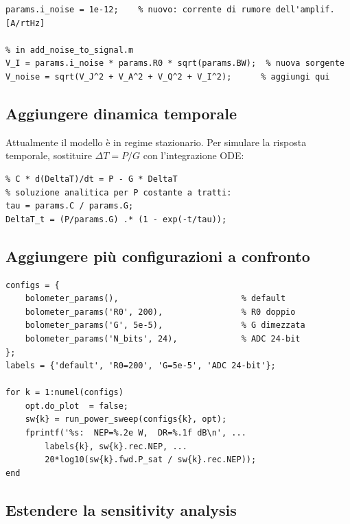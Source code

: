 \documentclass[11pt,a4paper]{article}
\begin{document}
\begin{lstlisting}[caption={Schema per aggiungere una nuova sorgente di rumore}]
% in bolometer_params.m
params.i_noise = 1e-12;    % nuovo: corrente di rumore dell'amplif. [A/rtHz]

% in add_noise_to_signal.m
V_I = params.i_noise * params.R0 * sqrt(params.BW);  % nuova sorgente
V_noise = sqrt(V_J^2 + V_A^2 + V_Q^2 + V_I^2);      % aggiungi qui
\end{lstlisting}

\subsection{Aggiungere dinamica temporale}

Attualmente il modello è in regime stazionario. Per simulare la
risposta temporale, sostituire $\Delta T = P/G$ con l'integrazione ODE:

\begin{lstlisting}[caption={Schema per risposta temporale}]
% in forward_model.m -- modalita' dinamica
% C * d(DeltaT)/dt = P - G * DeltaT
% soluzione analitica per P costante a tratti:
tau = params.C / params.G;
DeltaT_t = (P/params.G) .* (1 - exp(-t/tau));
\end{lstlisting}

\subsection{Aggiungere più configurazioni a confronto}

\begin{lstlisting}[caption={Confronto tra configurazioni in main.m}]
configs = {
    bolometer_params(),                         % default
    bolometer_params('R0', 200),                % R0 doppio
    bolometer_params('G', 5e-5),                % G dimezzata
    bolometer_params('N_bits', 24),             % ADC 24-bit
};
labels = {'default', 'R0=200', 'G=5e-5', 'ADC 24-bit'};

for k = 1:numel(configs)
    opt.do_plot  = false;
    sw{k} = run_power_sweep(configs{k}, opt);
    fprintf('%s:  NEP=%.2e W,  DR=%.1f dB\n', ...
        labels{k}, sw{k}.rec.NEP, ...
        20*log10(sw{k}.fwd.P_sat / sw{k}.rec.NEP));
end
\end{lstlisting}

\subsection{Estendere la sensitivity analysis}
\end{document}
